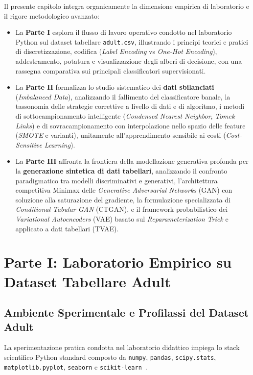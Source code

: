 Il presente capitolo integra organicamente la dimensione empirica di laboratorio e il rigore metodologico avanzato:
\begin{itemize}
    \item La \textbf{Parte I} esplora il flusso di lavoro operativo condotto nel laboratorio Python sul dataset tabellare \texttt{adult.csv}, illustrando i principi teorici e pratici di discretizzazione, codifica (\textit{Label Encoding} vs \textit{One-Hot Encoding}), addestramento, potatura e visualizzazione degli alberi di decisione, con una rassegna comparativa sui principali classificatori supervisionati.
    \item La \textbf{Parte II} formalizza lo studio sistematico dei \textbf{dati sbilanciati} (\textit{Imbalanced Data}), analizzando il fallimento del classificatore banale, la tassonomia delle strategie correttive a livello di dati e di algoritmo, i metodi di sottocampionamento intelligente (\textit{Condensed Nearest Neighbor}, \textit{Tomek Links}) e di sovracampionamento con interpolazione nello spazio delle feature (\textit{SMOTE} e varianti), unitamente all'apprendimento sensibile ai costi (\textit{Cost-Sensitive Learning}).
    \item La \textbf{Parte III} affronta la frontiera della modellazione generativa profonda per la \textbf{generazione sintetica di dati tabellari}, analizzando il confronto paradigmatico tra modelli discriminativi e generativi, l'architettura competitiva Minimax delle \textit{Generative Adversarial Networks} (GAN) con soluzione alla saturazione del gradiente, la formulazione specializzata di \textit{Conditional Tabular GAN} (CTGAN), e il framework probabilistico dei \textit{Variational Autoencoders} (VAE) basato sul \textit{Reparameterization Trick} e applicato a dati tabellari (TVAE).
\end{itemize}
\FloatBarrier
\section{Parte I: Laboratorio Empirico su Dataset Tabellare Adult}
\label{sec:dm-lab-adult}

\FloatBarrier
\subsection{Ambiente Sperimentale e Profilassi del Dataset Adult}
\label{subsec:dm-lab-dataset}

La sperimentazione pratica condotta nel laboratorio didattico impiega lo stack scientifico Python standard composto da \texttt{numpy}, \texttt{pandas}, \texttt{scipy.stats}, \texttt{matplotlib.pyplot}, \texttt{seaborn} e \texttt{scikit-learn}~\cite{mannocci2026imbalanced}.

